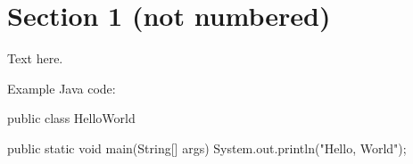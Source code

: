 \documentclass[a4paper,11pt]{report}
\begin{document}
\section*{Section 1 (not numbered)}

Text here.

Example Java code:

\begin{javacode}
public class HelloWorld {

    public static void main(String[] args) {
        System.out.println("Hello, World");
    }

}
\end{javacode}
\end{document}
